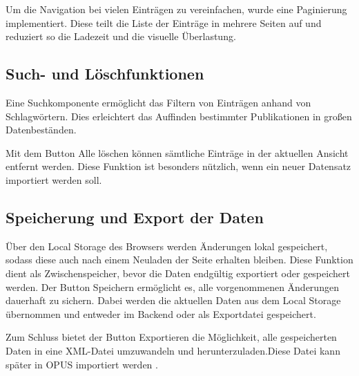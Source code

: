 Um die Navigation bei vielen Einträgen zu vereinfachen, wurde eine Paginierung implementiert.
Diese teilt die Liste der Einträge in mehrere Seiten auf und reduziert so die Ladezeit und die visuelle Überlastung.

\subsection{Such- und Löschfunktionen}
Eine Suchkomponente ermöglicht das Filtern von Einträgen anhand von Schlagwörtern.
Dies erleichtert das Auffinden bestimmter Publikationen in großen Datenbeständen.

Mit dem Button \glqq Alle löschen\grqq{} können sämtliche Einträge in der aktuellen Ansicht entfernt werden.
Diese Funktion ist besonders nützlich, wenn ein neuer Datensatz importiert werden soll.

\subsection{Speicherung und Export der Daten}
Über den Local Storage des Browsers werden Änderungen lokal gespeichert,
sodass diese auch nach einem Neuladen der Seite erhalten bleiben.
Diese Funktion dient als Zwischenspeicher, bevor die Daten endgültig exportiert oder gespeichert werden.
Der Button \glqq Speichern\grqq{} ermöglicht es, alle vorgenommenen Änderungen dauerhaft zu sichern.
Dabei werden die aktuellen Daten aus dem Local Storage übernommen und entweder im Backend oder als Exportdatei gespeichert.

Zum Schluss  bietet der Button \glqq Exportieren\grqq{} die Möglichkeit,
alle gespeicherten Daten in eine XML-Datei umzuwandeln und herunterzuladen.Diese Datei kann später in OPUS importiert werden .
